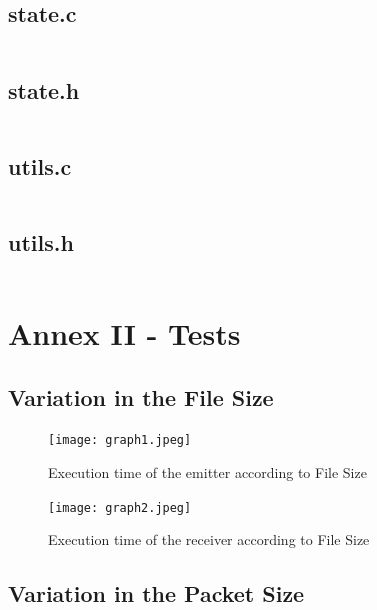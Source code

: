 \documentclass[11pt]{article}
\begin{document}
\newpage

\subsection*{state.c}

\inputminted{c}{state.c}

\newpage

\subsection*{state.h}

\inputminted{c}{state.h}

\newpage

\subsection*{utils.c}

\inputminted{c}{utils.c}

\newpage

\subsection*{utils.h}

\inputminted{c}{utils.h}

\section*{Annex II - Tests}

\subsection*{Variation in the File Size}

\begin{figure}[h]
    \centering
    \texttt{[image: graph1.jpeg]}
    \caption{Execution time of the emitter according to File Size}
\end{figure}

\begin{figure}[h]
    \centering
    \texttt{[image: graph2.jpeg]}
    \caption{Execution time of the receiver according to File Size}
\end{figure}

\newpage

\subsection*{Variation in the Packet Size}
\end{document}
